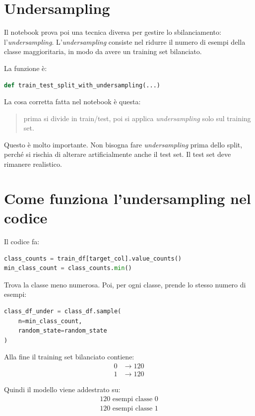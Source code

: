 \documentclass[11pt,a4paper]{article}
\begin{document}
\section{Undersampling}
Il notebook prova poi una tecnica diversa per gestire lo sbilanciamento: l'\textit{undersampling}. L'\textit{undersampling} consiste nel ridurre il numero di esempi della classe maggioritaria, in modo da avere un training set bilanciato.

La funzione è:
\begin{lstlisting}[language=Python]
def train_test_split_with_undersampling(...)
\end{lstlisting}

La cosa corretta fatta nel notebook è questa:
\begin{quote}
    prima si divide in train/test, poi si applica \textit{undersampling} solo sul training set.
\end{quote}

Questo è molto importante. Non bisogna fare \textit{undersampling} prima dello split, perché si rischia di alterare artificialmente anche il test set. Il test set deve rimanere realistico.

\section{Come funziona l'undersampling nel codice}
Il codice fa:

\begin{lstlisting}[language=Python]
class_counts = train_df[target_col].value_counts()
min_class_count = class_counts.min()
\end{lstlisting}

Trova la classe meno numerosa. Poi, per ogni classe, prende lo stesso numero di esempi:

\begin{lstlisting}[language=Python]
class_df_under = class_df.sample(
    n=min_class_count,
    random_state=random_state
)
\end{lstlisting}

Alla fine il training set bilanciato contiene:
\begin{align*}
    0 &\rightarrow 120 \\
    1 &\rightarrow 120
\end{align*}

Quindi il modello viene addestrato su:
\begin{align*}
    120 \text{ esempi classe 0} \\
    120 \text{ esempi classe 1}
\end{align*}
\end{document}
